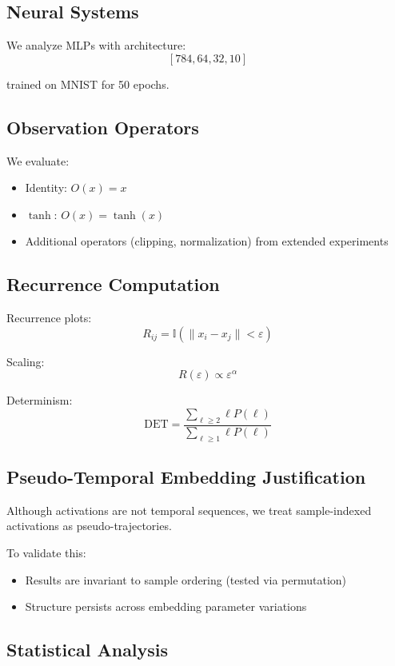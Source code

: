 \documentclass[11pt]{article}
\begin{document}
\subsection{Neural Systems}

We analyze MLPs with architecture:
\[
	[784, 64, 32, 10]
\]

trained on MNIST for 50 epochs.

\subsection{Observation Operators}

We evaluate:
\begin{itemize}
	\item Identity: $O(x) = x$
	\item $\tanh$: $O(x) = \tanh(x)$
	\item Additional operators (clipping, normalization) from extended experiments
\end{itemize}

\subsection{Recurrence Computation}

Recurrence plots:
\[
	R_{ij} = \mathbb{I}(\|x_i - x_j\| < \varepsilon)
\]

Scaling:
\[
	R(\varepsilon) \propto \varepsilon^\alpha
\]

Determinism:
\[
	\mathrm{DET} = \frac{\sum_{\ell \ge 2} \ell P(\ell)}{\sum_{\ell \ge 1} \ell P(\ell)}
\]

\subsection{Pseudo-Temporal Embedding Justification}

Although activations are not temporal sequences, we treat sample-indexed activations as pseudo-trajectories.

To validate this:
\begin{itemize}
	\item Results are invariant to sample ordering (tested via permutation)
	\item Structure persists across embedding parameter variations
\end{itemize}

\subsection{Statistical Analysis}
\end{document}
